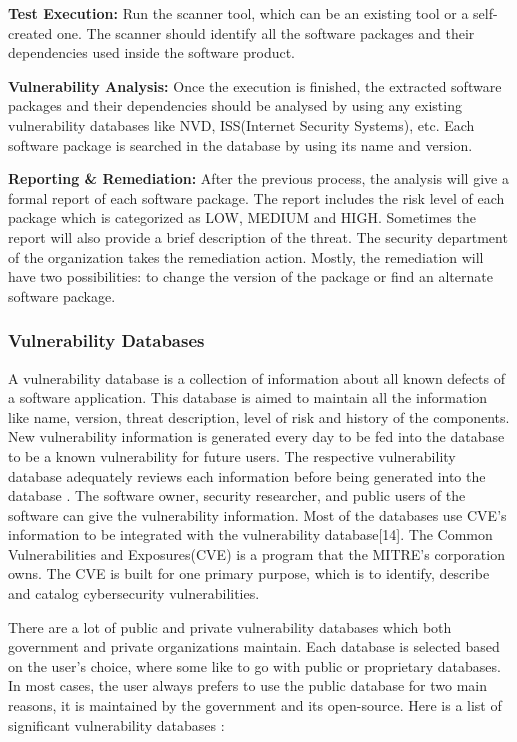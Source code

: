 	\textbf{Test Execution:} Run the scanner tool, which can be an existing tool or a self-created one. The scanner should identify all the software packages and their dependencies used inside the software product.
	
	\textbf{Vulnerability Analysis:} Once the execution is finished, the extracted software packages and their dependencies should be analysed by using any existing vulnerability databases like \acs{NVD}, ISS(Internet Security Systems), etc. Each software package is searched in the database by using its name and version.
	
	\textbf{Reporting \& Remediation:} After the previous process, the analysis will give a formal report of each software package. The report includes the risk level of each package which is categorized as LOW, MEDIUM and  HIGH. Sometimes the report will also provide a brief description of the threat. The security department of the organization takes the remediation action. Mostly, the remediation will have two possibilities: to change the version of the package or find an alternate software package.

\subsubsection{Vulnerability Databases}
A vulnerability database is a collection of information about all known defects of a software application. This database is aimed to maintain all the information like name, version, threat description, level of risk and history of the components. New vulnerability information is generated every day to be fed into the database to be a known vulnerability for future users. The respective vulnerability database adequately reviews each information before being generated into the database \cite{Va2017}. The software owner, security researcher, and public users of the software can give the vulnerability information. Most of the databases use \acs{CVE}’s information to be integrated with the vulnerability database[14]. The Common Vulnerabilities and Exposures(\acs{CVE}) is a program that the MITRE’s corporation owns. The \acs{CVE} is built for one primary purpose, which is to identify, describe and catalog cybersecurity vulnerabilities.

There are a lot of public and private vulnerability databases which both government and private organizations maintain. Each database is selected based on the user's choice, where some like to go with public or proprietary databases. In most cases, the user always prefers to use the public database for two main reasons, it is maintained by the government and its open-source. Here is a list of significant vulnerability databases \cite{LoAc2011}:

